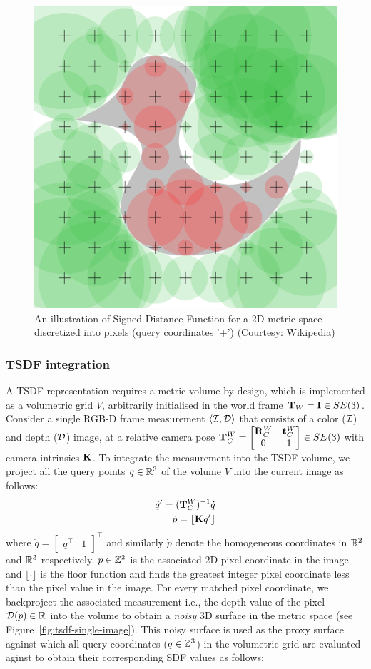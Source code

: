 \begin{figure}[htpb]
    \centering
    \includegraphics[width=0.5\linewidth]{figs/2d-sdf.png}
    \caption{An illustration of Signed Distance Function for a 2D metric space discretized into pixels (query coordinates '+') (Courtesy: Wikipedia)}%
    \label{fig:2d-sdf}
\end{figure}

\subsubsection{TSDF integration}

A TSDF representation requires a metric volume by design, which is implemented as a volumetric grid $V$, arbitrarily initialised in the world frame $\mathbf{T}_W = \mathbf{I} \in SE(3)$. Consider a single RGB-D frame measurement $\langle \mathcal{I}, \mathcal{D} \rangle$ that consists of a color ($\mathcal{I}$) and depth ($\mathcal{D}$) image, at a relative camera pose $\mathbf{T}_C^W  = \begin{bmatrix}
    \mathbf{R}_C^W & \mathbf{t}_C^W \\ 0 & 1
\end{bmatrix}\in SE(3)$ with camera intrinsics $\mathbf{K}$. To integrate the measurement into the TSDF volume, we project  all the query points $q \in \mathbb{R}^3$ of the volume $V$ into the current image as follows:
\begin{align}
    \dot{q}^\prime = (\mathbf{T}_C^W)^{-1} \dot{q} \\
    \dot{p} = \lfloor \mathbf{K} q^\prime\rfloor
\end{align}
where $\dot{q} = \begin{bmatrix}
    q^\top & 1
\end{bmatrix}^\top$  and similarly $\dot{p}$ denote the homogeneous coordinates in $\mathbb{R}^2$ and $\mathbb{R}^3$ respectively. $p \in \mathbb{Z}^2$ is the associated 2D pixel coordinate in the image and $\lfloor \cdot \rfloor$ is the floor function and finds the greatest integer pixel coordinate less than the pixel value in the image. For every matched pixel coordinate, we backproject the associated measurement i.e., the depth value of the pixel $\mathcal{D}(p) \in \mathbb{R}$ into the volume to obtain a \emph{noisy} 3D surface in the metric space (see Figure~\ref{fig:tsdf-single-image}). This noisy surface is used as the proxy surface against which all query coordinates ($q \in \mathbb{Z}^3$) in the volumetric grid are evaluated aginst to obtain their corresponding SDF values as follows:

